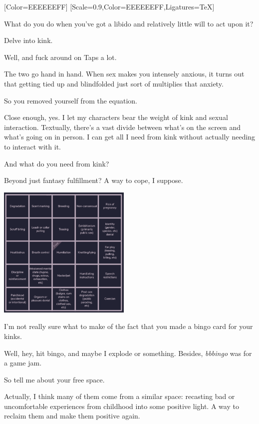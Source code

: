 [Color=EEEEEEFF]
\renewfontfamily{}[Scale=0.9,Color=EEEEEEFF,Ligatures=TeX]

\noindent What do you do when you've got a libido and relatively little will to act upon it?

Delve into kink.

\begin{ally}
Well, and fuck around on Taps a lot.
\end{ally}
The two go hand in hand. When sex makes you intensely anxious, it turns out that getting tied up and blindfolded just sort of multiplies that anxiety.

\begin{ally}
So you removed yourself from the equation.
\end{ally}
Close enough, yes. I let my characters bear the weight of kink and sexual interaction. Textually, there's a vast divide between what's on the screen and what's going on in person. I can get all I need from kink without actually needing to interact with it.

\begin{ally}
And what do you need from kink?
\end{ally}
Beyond just fantasy fulfillment? A way to cope, I suppose.

\noindent\includegraphics[width=2.5in]{assets/static/sex/kink/bingo.png}

\begin{ally}
I'm not really sure what to make of the fact that you made a bingo card for your kinks.
\end{ally}
Well, hey, hit bingo, and maybe I explode or something. Besides, \emph{bbbingo} was for a game jam.

\begin{ally}
So tell me about your free space.
\end{ally}
Actually, I think many of them come from a similar space: recasting bad or uncomfortable experiences from childhood into some positive light. A way to reclaim them and make them positive again.

